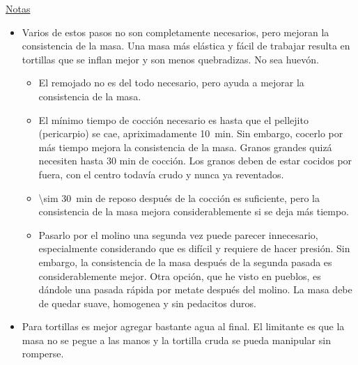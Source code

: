 \underline{Notas}
\begin{itemize}
\item Varios de estos pasos no son completamente necesarios, pero mejoran la consistencia de la masa. Una masa más elástica y fácil de trabajar resulta en tortillas que se inflan mejor y son menos quebradizas. No sea huevón.
\begin{itemize}
\item El remojado no es del todo necesario, pero ayuda a mejorar la consistencia de la masa.
\item El mínimo tiempo de cocción necesario es hasta que el pellejito (pericarpio) se cae, apriximadamente \SI{10}{min}. Sin embargo, cocerlo por más tiempo mejora la consistencia de la masa. Granos grandes quizá necesiten hasta 30 min de cocción. Los granos deben de estar cocidos por fuera, con el centro todavía crudo y nunca ya reventados.
\item \SI{\sim 30}{min} de reposo después de la cocción es suficiente, pero la consistencia de la masa mejora considerablemente si se deja más tiempo.
\item Pasarlo por el molino una segunda vez puede parecer innecesario, especialmente considerando que es difícil y requiere de hacer presión. Sin embargo, la consistencia de la masa después de la segunda pasada es considerablemente mejor. Otra opción, que he visto en pueblos, es dándole una pasada rápida por metate después del molino. La masa debe de quedar suave, homogenea y sin pedacitos duros.
\end{itemize}
\item Para tortillas es mejor agregar bastante agua al final. El limitante es que la masa no se pegue a las manos y la tortilla cruda se pueda manipular sin romperse.
\end{itemize}